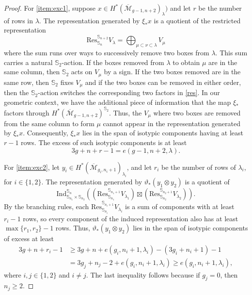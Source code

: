\documentclass[12pt]{amsart}
\theoremstyle{definition}
\numberwithin{equation}{section}
\renewcommand{\ss}{\mathbb{S}}
\newcommand{\M}{\mathcal{M}}
\newcommand{\Ind}{\mathrm{Ind}}
\newcommand{\Mb}{\overline{\M}}
\theoremstyle{definition} %
\theoremstyle{remark}
\newcommand{\Res}{\mathrm{Res}}
\begin{document}
\begin{proof}
For \eqref{item:exc1}, suppose $x \in H^*(\Mb_{g-1,n+2})_\lambda)$ and let $r$ be the number of rows in $\lambda$. The representation generated by $\xi_*x$ is a quotient of the restricted representation 
\begin{equation} \label{res} \Res^{\ss_{n+2}}_{\ss_n}V_\lambda = \bigoplus_{\mu \subset \nu \subset \lambda} V_{\mu}
\end{equation}
where the sum runs over ways to successively remove two boxes from $\lambda$.
This sum carries a natural $\ss_2$-action.
If the boxes removed from $\lambda$ to obtain $\mu$ are in the same column, then $\ss_2$ acts on $V_{\mu}$ by a sign. If the two boxes removed are in the same row, then $\ss_2$ fixes $V_\mu$ and if the two boxes can be removed in either order, then the $\ss_2$-action switches the corresponding two factors in \eqref{res}.
In our geometric context, we have the additional piece of information that the map $\xi_*$ factors through $H^*(\Mb_{g-1,n+2})^{\ss_2}$.
Thus, the $V_{\mu}$ where two boxes are removed from the same column to form $\mu$ cannot appear in the representation generated by $\xi_*x$.
Consequently, $\xi_*x$ lies in the span of isotypic components having at least $r - 1$ rows.
The excess of such isotypic components is at least
\[3g + n + r - 1 = e(g-1,n+2, \lambda).\]

For \eqref{item:exc2}, let $y_i \in H^*(\Mb_{g_i, n_i+1})_{\lambda_i}$, and let $r_i$ be the number of rows of $\lambda_i$, for $i \in \{1,2\}$.
The representation generated by $\vartheta_*(y_1 \otimes y_2)$ is a quotient of \[
\Ind_{\ss_{n_1} \times \ss_{n_2}}^{\ss_n}((\Res^{\ss_{n_1+1}}_{\ss_{n_1}}V_{\lambda_1}) \boxtimes (\Res^{\ss_{n_2+1}}_{\ss_{n_2}}V_{\lambda_2})).\]
By the branching rules, each
$\Res^{\ss_{n_i+1}}_{\ss_{n_i}}V_{\lambda_i}$ is a sum of components with at least $r_i - 1$ rows, so every component of the induced representation also has at least $\max\{r_1,r_2\} - 1$ rows. Thus,
$\vartheta_*(y_1 \otimes y_2)$ lies in the span of 
isotypic components of excess at least 
\begin{align*} 3g + n + r_i - 1 &\geq 3g + n + e(g_i,n_i+1,\lambda_i) - (3g_i + n_i +1) - 1 \\
&= 3g_j + n_j - 2 + e(g_i,n_i+1,\lambda_i) \geq e(g_i,n_i+1,\lambda_i),
\end{align*}
where $i,j\in \{1,2\}$ and $i\neq j$.
The last inequality follows because if $g_j = 0$, then $n_j \geq 2$.
\end{proof}
\end{document}
